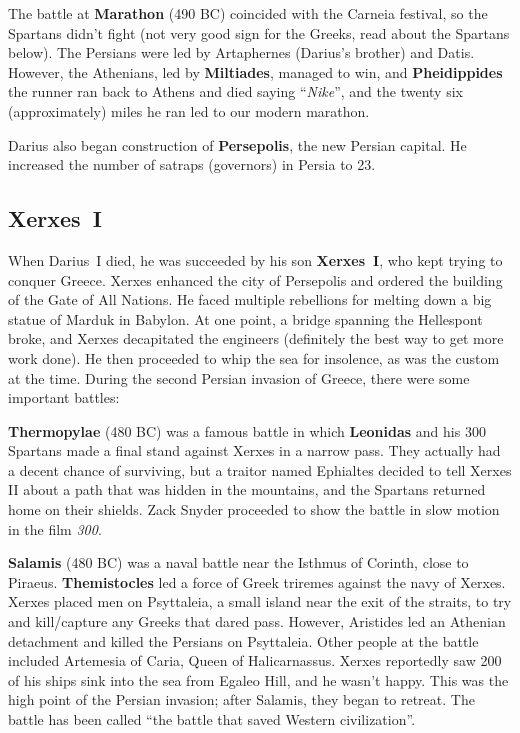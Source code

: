 The battle at \textbf{Marathon} (490 BC) coincided with the Carneia festival,
so the Spartans didn't fight (not very good sign for the Greeks, read about the Spartans below).
The Persians were led by Artaphernes (Darius's brother) and Datis.
However, the Athenians, led by \textbf{Miltiades}, managed to win,
and \textbf{Pheidippides} the runner ran back to Athens and died saying ``\textit{Nike}'',
and the twenty six (approximately) miles he ran led to our modern marathon.

Darius also began construction of \textbf{Persepolis}, the new Persian capital.
He increased the number of satraps (governors) in Persia to 23.

\subsection*{Xerxes~I}

When Darius~I died, he was succeeded by his son \textbf{Xerxes~I}, who kept trying to conquer Greece.
Xerxes enhanced the city of Persepolis and ordered the building of the Gate of All Nations.
He faced multiple rebellions for melting down a big statue of Marduk in Babylon.
At one point, a bridge spanning the Hellespont broke, and Xerxes decapitated the engineers
(definitely the best way to get more work done).
He then proceeded to whip the sea for insolence, as was the custom at the time.
During the second Persian invasion of Greece, there were some important battles:

\textbf{Thermopylae} (480 BC) was a famous battle in which \textbf{Leonidas} and his 300 Spartans
made a final stand against Xerxes in a narrow pass.
They actually had a decent chance of surviving,
but a traitor named Ephialtes decided to tell Xerxes II about a path that
was hidden in the mountains, and the Spartans returned home on their shields.
Zack Snyder proceeded to show the battle in slow motion in the film \textit{300}.

\textbf{Salamis} (480 BC) was a naval battle near the Isthmus of Corinth, close to Piraeus.
\textbf{Themistocles} led a force of Greek triremes against the navy of Xerxes.
Xerxes placed men on Psyttaleia, a small island near the exit of the straits,
to try and kill/capture any Greeks that dared pass.
However, Aristides led an Athenian detachment and killed the Persians on Psyttaleia.
Other people at the battle included Artemesia of Caria, Queen of Halicarnassus.
Xerxes reportedly saw 200 of his ships sink into the sea from Egaleo Hill, and he wasn't happy.
This was the high point of the Persian invasion; after Salamis, they began to retreat.
The battle has been called ``the battle that saved Western civilization''.

